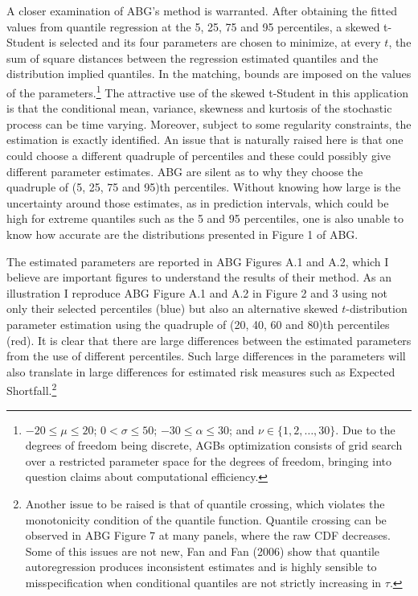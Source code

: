 \documentclass[12pt,]{article}
\let\rmarkdownfootnote\footnote%
\def\footnote{\protect\rmarkdownfootnote}
\begin{document}
A closer examination of ABG's method is warranted. After obtaining the
fitted values from quantile regression at the 5, 25, 75 and 95
percentiles, a skewed t-Student is selected and its four parameters are
chosen to minimize, at every \(t\), the sum of square distances between
the regression estimated quantiles and the distribution implied
quantiles. In the matching, bounds are imposed on the values of the
parameters.\footnote{$-20 \leq \mu \leq 20$; $0 < \sigma \leq 50$; $-30 \leq \alpha \leq 30$; and $\nu \in \{1,2, \dots,30\}$. Due to the degrees of freedom being discrete, AGBs optimization consists of grid search over a restricted parameter space for the degrees of freedom, bringing into question claims about computational efficiency.}
The attractive use of the skewed t-Student in this application is that
the conditional mean, variance, skewness and kurtosis of the stochastic
process can be time varying. Moreover, subject to some regularity
constraints, the estimation is exactly identified. An issue that is
naturally raised here is that one could choose a different quadruple of
percentiles and these could possibly give different parameter estimates.
ABG are silent as to why they choose the quadruple of (5, 25, 75 and
95)th percentiles. Without knowing how large is the uncertainty around
those estimates, as in prediction intervals, which could be high for
extreme quantiles such as the 5 and 95 percentiles, one is also unable
to know how accurate are the distributions presented in Figure 1 of ABG.

The estimated parameters are reported in ABG Figures A.1 and A.2, which
I believe are important figures to understand the results of their
method. As an illustration I reproduce ABG Figure A.1 and A.2 in Figure
2 and 3 using not only their selected percentiles (blue) but also an
alternative skewed \(t\)-distribution parameter estimation using the
quadruple of (20, 40, 60 and 80)th percentiles (red). It is clear that
there are large differences between the estimated parameters from the
use of different percentiles. Such large differences in the parameters
will also translate in large differences for estimated risk measures
such as Expected
Shortfall.\footnote{Another issue to be raised is that of quantile crossing, which violates the monotonicity condition of the quantile function. Quantile crossing can be observed in ABG Figure 7 at many panels, where the raw CDF decreases. Some of this issues are not new, Fan and Fan (2006) show that quantile autoregression produces inconsistent estimates and is highly sensible to misspecification when conditional quantiles are not strictly increasing in $\tau$.}
\end{document}
